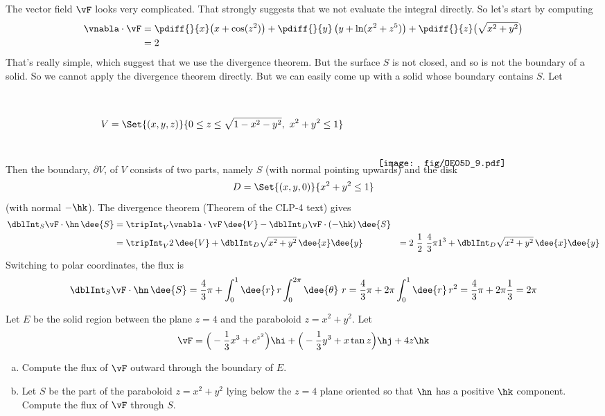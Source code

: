 \begin{solution}
The vector field $\vF$ looks very complicated. 
That strongly suggests that we not evaluate the integral directly.
So let's start by computing
\begin{align*}
\vnabla\cdot\vF &= 
    \pdiff{}{x}\big(x + \cos(z^2)\big)
     +\pdiff{}{y}\left(y + \ln(x^2 + z^5)\right)
     +\pdiff{}{z}\big(\sqrt{x^2 + y^2}\big) \\
   &=   2
\end{align*}
That's really simple, which suggest that we use the divergence theorem.
But the surface $S$ is not closed, and so is not the boundary of a solid.
So we cannot apply the divergence theorem directly. But we can easily
come up with a solid whose boundary contains $S$. Let
\begin{equation*}
V=\Set{(x,y,z)}{0\le z\le \sqrt{1-x^2-y^2},\ x^2+y^2\le 1}
    \hskip0.5in\raisebox{-40pt}[40pt][30pt]
                         {\texttt{[image: fig/OE05D\_9.pdf]}}
\end{equation*}
Then the boundary, $\partial V$, of $V$ consists of two parts, namely $S$
(with normal pointing upwards) and the disk
\begin{equation*}
D=\Set{(x,y,0)}{x^2+y^2\le 1}
\end{equation*}
(with normal $-\hk$).  The divergence theorem 
(Theorem  of the CLP-4 text) gives
\begin{align*}
\dblInt_S \vF \cdot \hn\,\dee{S}
&=\tripInt_V \vnabla\cdot\vF\,\dee{V}
    -\dblInt_D \vF \cdot (-\hk)\,\dee{S} \\
&=\tripInt_V 2\,\dee{V}
  +\dblInt_D \sqrt{x^2+y^2}\,\dee{x}\dee{y} 
&=2\ \frac{1}{2}\ \frac{4}{3}\pi 1^3
  +\dblInt_D \sqrt{x^2+y^2}\,\dee{x}\dee{y} 
\end{align*}
Switching to polar coordinates, the flux is
\begin{align*}
\dblInt_S \vF\cdot\hn\,\dee{S}
=\frac{4}{3}\pi+\int_0^1\dee{r}\,r\int_0^{2\pi}\dee{\theta}\ r
=\frac{4}{3}\pi + 2\pi \int_0^1 \dee{r}\, r^2
=\frac{4}{3}\pi + 2\pi \frac{1}{3}
=2\pi
\end{align*}

\end{solution}

\begin{question}[M317 2015A]  %
Let $E$ be the solid region between the plane $z = 4$ and the paraboloid 
$z = x^2 + y^2$. Let
\begin{equation*}
\vF = \Big(-\frac{1}{3}x^3 + e^{z^2}\Big)\hi 
     + \Big(-\frac{1}{3}y^3 + x\tan z\Big)\hj + 4z\hk
\end{equation*}
\begin{enumerate}[(a)]
\item
Compute the flux of $\vF$ outward through the boundary of $E$.

\item
Let $S$ be the part of the paraboloid $z = x^2 + y^2$ lying below the 
$z = 4$ plane oriented so that $\hn$ has a positive $\hk$ component. 
Compute the flux of $\vF$ through $S$.
\end{enumerate}

\end{question}

